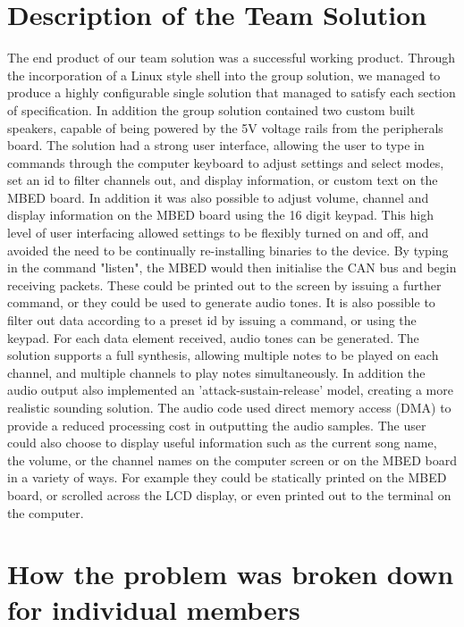 \section{Description of the Team Solution}

The end product of our team solution was a successful working product. Through the 
incorporation of a Linux style shell into the group solution, we managed to produce 
a highly configurable single solution that managed to satisfy each section of 
specification. In addition the group solution contained two custom built speakers, 
capable of being powered by the 5V voltage rails from the peripherals board. 
The solution had a strong user interface, allowing the user to type in commands 
through the computer keyboard to adjust settings and select modes, set an id 
to filter channels out, and display information, or custom text on the MBED 
board. In addition it was also possible to adjust volume, channel and display 
information on the MBED board using the 16 digit keypad. This high level of 
user interfacing allowed settings to be flexibly turned on and off, and 
avoided the need to be continually re-installing binaries to the device. 
By typing in the command "listen", the MBED would then initialise the CAN bus 
and begin receiving packets. These could be printed out to the screen by issuing
a further command, or they could be used to generate audio tones. It is also 
possible to filter out data according to a preset id by issuing a command, or 
using the keypad. For each data element received, audio tones can be generated. 
The solution supports a full synthesis, allowing multiple notes to be played
on each channel, and multiple channels to play notes simultaneously. In addition 
the audio output also implemented an 'attack-sustain-release' model, creating a 
more realistic sounding solution. The audio code used direct memory access (DMA)
to provide a reduced processing cost in outputting the audio samples.
The user could also choose to display useful information such as the current 
song name, the volume, or the channel names on the computer screen or on the 
MBED board in a variety of ways. For example they could be statically printed on
the MBED board, or scrolled across the LCD display, or even printed out to 
the terminal on the computer.

\section{How the problem was broken down for individual members}

